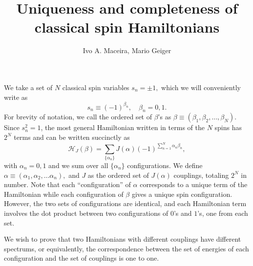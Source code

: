 \documentclass[a4paper]{article}
\title{Uniqueness and completeness of classical spin Hamiltonians}
\author{Ivo A. Maceira, Mario Geiger}
\newcommand{\Ha}[0]{\mathcal{H}}
\begin{document}
\maketitle

We take a set of $N$ classical spin variables
$
s_n = \pm 1,
$
which we will conveniently write as
\begin{equation}
	s_n \equiv (-1)^{\beta_n},\quad \beta_n = 0,1.
\end{equation}
For brevity of notation, we call the ordered set of $\beta$'s as $\beta \equiv (\beta_1,\beta_2,\dots,\beta_N)$.
Since $s_n^2 = 1$, the most general Hamiltonian written in terms of the $N$ spins has $2^N$ terms and can be written succinctly as
\begin{equation}
	\Ha_J(\beta) = \sum_{\{\alpha_n\}} J(\alpha) (-1)^{\sum_{n=1}^{N} \alpha_n \beta_n},
\end{equation}
with $\alpha_n = 0,1$ and we sum over all $\{\alpha_n\}$ configurations. We define
$
\alpha \equiv (\alpha_1,\alpha_2,\dots\alpha_n),
$
and $J$ as the ordered set of $J(\alpha)$ couplings, totaling $2^N$ in number. Note that each ``configuration'' of $\alpha$ corresponds to a unique term of the Hamiltonian while each configuration of $\beta$ gives a unique spin configuration. However, the two sets of configurations are identical, and each Hamiltonian term involves the dot product between two configurations of $0$'s and $1$'s, one from each set.

We wish to prove that two Hamiltonians with different couplings have different spectrums, or equivalently, the correspondence between the set of energies of each configuration and the set of couplings is one to one.
\end{document}
